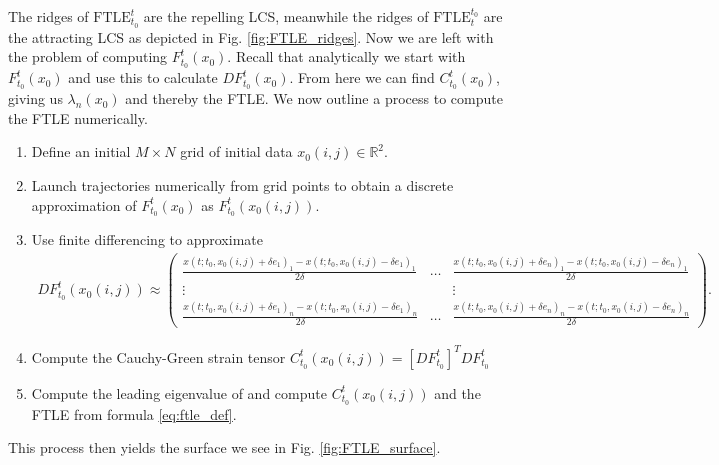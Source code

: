 The ridges of $ \textrm{FTLE} _{t_0}^{t}$ are the repelling LCS, meanwhile the ridges of $ \textrm{FTLE} _{t}^{t_0}$ are the attracting LCS as depicted in Fig. \ref{fig:FTLE_ridges}. Now we are left with the problem of computing $F_{t_0}^{t}( {x}_0)$. Recall that analytically we start with $F_{t_0}^{t}( {x}_0)$ and use this to calculate $DF_{t_0}^{t}( {x}_0)$. From here we can find $C_{t_0}^{t}( {x}_0)$, giving us $\lambda_n( {x}_0)$ and thereby the FTLE. We now outline a process to compute the FTLE numerically.
\begin{enumerate}
	\item Define an initial $M\times N$ grid of initial data $ {x}_0(i,j) \in \mathbb{R}^2$.
	\item Launch trajectories numerically from grid points to obtain a discrete approximation of $F_{t_0}^{t}( {x}_0)$ as $F_{t_0}^{t}( {x}_0(i,j))$.
	\item Use finite differencing to approximate 
		\begin{align}
			DF_{t_0}^{t}( {x}_0(i,j)) \approx
		\begin{pmatrix}
			\frac{x(t; t_0, x_0(i,j) + \delta e_1)_1 - x(t; t_0, x_{0}(i,j) - \delta e_1)_1}{2\delta} &
			\ldots &
			\frac{x(t; t_0, x_0(i,j) + \delta e_n)_1 - x(t; t_0, x_{0}(i,j) - \delta e_n)_1}{2\delta}\\
			\vdots & & \vdots \\
			\frac{x(t; t_0, x_0(i,j) + \delta e_1)_n - x(t; t_0, x_{0}(i,j) - \delta e_1)_n}{2\delta} &
			\ldots &
			\frac{x(t; t_0, x_0(i,j) + \delta e_n)_n - x(t; t_0, x_{0}(i,j) - \delta e_n)_n}{2\delta} 
		\end{pmatrix}
		.
		\end{align}
		\item Compute the Cauchy-Green strain tensor $C_{t_0}^t\left( x_0(i,j)\right) =\left[DF_{t_0}^{t}\right]^TDF_{t_0}^{t}$
		\item Compute the leading eigenvalue of  and compute $C_{t_0}^t\left( x_0(i,j)\right)$ and the FTLE from formula \eqref{eq:ftle_def}. 
\end{enumerate}
This process then yields the surface we see in Fig. \ref{fig:FTLE_surface}.
